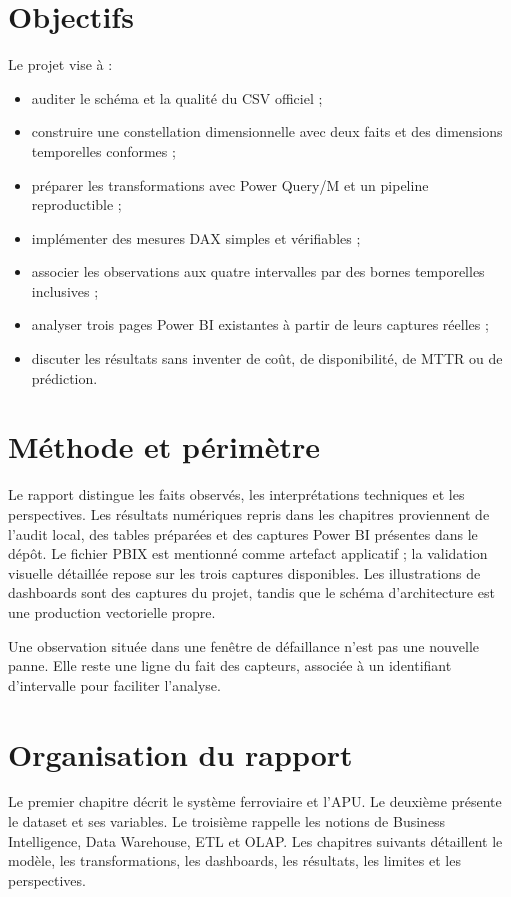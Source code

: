 \section{Objectifs}
Le projet vise à :
\begin{itemize}
\item auditer le schéma et la qualité du CSV officiel ;
\item construire une constellation dimensionnelle avec deux faits et des dimensions temporelles conformes ;
\item préparer les transformations avec Power Query/M et un pipeline reproductible ;
\item implémenter des mesures DAX simples et vérifiables ;
\item associer les observations aux quatre intervalles par des bornes temporelles inclusives ;
\item analyser trois pages Power BI existantes à partir de leurs captures réelles ;
\item discuter les résultats sans inventer de coût, de disponibilité, de MTTR ou de prédiction.
\end{itemize}

\section{Méthode et périmètre}
Le rapport distingue les faits observés, les interprétations techniques et les perspectives. Les résultats numériques repris dans les chapitres proviennent de l'audit local, des tables préparées et des captures Power BI présentes dans le dépôt. Le fichier PBIX est mentionné comme artefact applicatif ; la validation visuelle détaillée repose sur les trois captures disponibles. Les illustrations de dashboards sont des captures du projet, tandis que le schéma d'architecture est une production vectorielle propre.

\begin{pedagogie}
Une observation située dans une fenêtre de défaillance n'est pas une nouvelle panne. Elle reste une ligne du fait des capteurs, associée à un identifiant d'intervalle pour faciliter l'analyse.
\end{pedagogie}

\section{Organisation du rapport}
Le premier chapitre décrit le système ferroviaire et l'APU. Le deuxième présente le dataset et ses variables. Le troisième rappelle les notions de Business Intelligence, Data Warehouse, ETL et OLAP. Les chapitres suivants détaillent le modèle, les transformations, les dashboards, les résultats, les limites et les perspectives.

